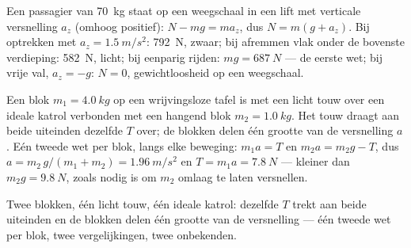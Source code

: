 \begin{example}[De lift]\label{ex:g12:newtons-laws:elevator}
Een passagier van \qty{70}{kg} staat op een weegschaal in een lift met verticale
versnelling $a_z$ (omhoog positief): $N - mg = ma_z$, dus $N = m(g + a_z)$. Bij
optrekken met $a_z = \qty{1.5}{m/s^2}$: \qty{792}{N}, zwaar; bij afremmen vlak onder
de bovenste verdieping: \qty{582}{N}, licht; bij eenparig rijden:
$mg = \qty{687}{N}$ --- de eerste wet; bij vrije val, $a_z = -g$: $N = 0$,
gewichtloosheid op een weegschaal.
\end{example}

\begin{example}\label{ex:g12:newtons-laws:pulley}
Een blok $m_1 = \qty{4.0}{kg}$ op een wrijvingsloze tafel is met een licht touw over
een ideale katrol verbonden met een hangend blok $m_2 = \qty{1.0}{kg}$. Het touw
draagt aan beide uiteinden dezelfde  $T$ over; de blokken delen één
grootte van de versnelling $a$. Eén tweede wet per blok, langs elke beweging:
$m_1 a = T$ en $m_2 a = m_2 g - T$, dus
$a = m_2\,g/(m_1 + m_2) = \qty{1.96}{m/s^2}$ en $T = m_1 a = \qty{7.8}{N}$ ---
kleiner dan $m_2 g = \qty{9.8}{N}$, zoals nodig is om $m_2$ omlaag te laten
versnellen.
\end{example}

\begin{omfigure}

{\small Twee blokken, één licht touw, één ideale katrol: dezelfde  $T$
trekt aan beide uiteinden en de blokken delen één grootte van de versnelling --- één
tweede wet per blok, twee vergelijkingen, twee onbekenden.}
\end{omfigure}


